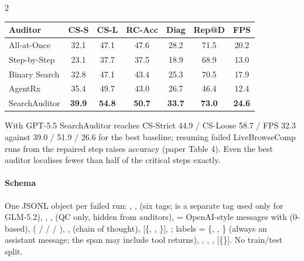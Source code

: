 \begin{multicols}{2}
\begin{center}\small\setlength{\tabcolsep}{3.5pt}
\begin{tabular}{@{}lcccccc@{}}\toprule
Auditor & CS-S & CS-L & RC-Acc & Diag & Rep@D & FPS\\\midrule
All-at-Once & 32.1 & 47.1 & 47.6 & 28.2 & 71.5 & 20.2\\
Step-by-Step & 23.1 & 37.7 & 37.5 & 18.9 & 68.9 & 13.0\\
Binary Search & 32.8 & 47.1 & 43.4 & 25.3 & 70.5 & 17.9\\
AgentRx & 35.4 & 49.7 & 43.0 & 26.7 & 46.4 & 12.4\\
SearchAuditor & \textbf{39.9} & \textbf{54.8} & \textbf{50.7} & \textbf{33.7} & \textbf{73.0} & \textbf{24.6}\\\bottomrule
\end{tabular}
\end{center}
With GPT-5.5 SearchAuditor reaches CS-Strict 44.9 / CS-Loose 58.7 / FPS 32.3 against 39.0 / 51.9 / 26.6 for the best baseline; resuming failed LiveBrowseComp runs from the repaired step raises accuracy (paper Table 4). Even the best auditor localises fewer than half of the critical steps exactly.

\paragraph{Schema} One JSONL object per failed run: , ,  (six tags;  is a separate tag used only for GLM-5.2), , ,  (QC only, hidden from auditors),  = OpenAI-style messages with  (0-based),  ( /  /  / ), ,  (chain of thought),  [\{, , \}], ; labels  = \{, , \} (always an assistant message; the span may include tool returns), , , ,  [\{\}]. No train/test split.
\end{multicols}

